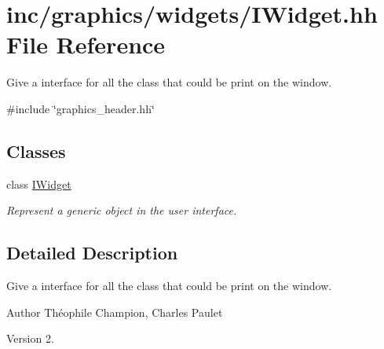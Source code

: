 \hypertarget{IWidget_8hh}{}\section{inc/graphics/widgets/\+I\+Widget.hh File Reference}
\label{IWidget_8hh}


Give a interface for all the class that could be print on the window.  


{\ttfamily \#include \char`\"{}graphics\+\_\+header.\+hh\char`\"{}}\newline
\subsection*{Classes}
\begin{DoxyCompactItemize}
\item 
class \hyperlink{classIWidget}{I\+Widget}
\begin{DoxyCompactList}\small\item\em Represent a generic object in the user interface. \end{DoxyCompactList}\end{DoxyCompactItemize}


\subsection{Detailed Description}
Give a interface for all the class that could be print on the window. 

\begin{DoxyAuthor}{Author}
Théophile Champion, Charles Paulet 
\end{DoxyAuthor}
\begin{DoxyVersion}{Version}
2. 
\end{DoxyVersion}
